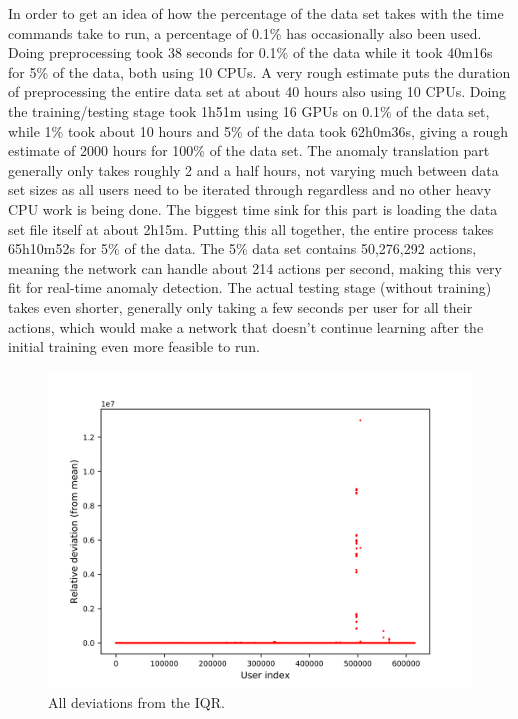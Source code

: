 In order to get an idea of how the percentage of the data set takes with the time commands take to run, a percentage of 0.1\% has occasionally also been used. Doing preprocessing took 38 seconds for 0.1\% of the data while it took 40m16s for 5\% of the data, both using 10 CPUs. A very rough estimate puts the duration of preprocessing the entire data set at about 40 hours also using 10 CPUs. Doing the training/testing stage took 1h51m using 16 GPUs on 0.1\% of the data set, while 1\% took about 10 hours and 5\% of the data took 62h0m36s, giving a rough estimate of 2000 hours for 100\% of the data set. The anomaly translation part generally only takes roughly 2 and a half hours, not varying much between data set sizes as all users need to be iterated through regardless and no other heavy CPU work is being done. The biggest time sink for this part is loading the data set file itself at about 2h15m. Putting this all together, the entire process takes 65h10m52s for 5\% of the data. The 5\% data set contains 50,276,292 actions, meaning the network can handle about 214 actions per second, making this very fit for real-time anomaly detection. The actual testing stage (without training) takes even shorter, generally only taking a few seconds per user for all their actions, which would make a network that doesn't continue learning after the initial training even more feasible to run.

\begin{figure}
	\begin{center}
		\includegraphics[scale=0.1]{evaluation/all_deviations}
	\end{center}
	\caption{All deviations from the IQR.~\label{fig:iqr_scale}}
\end{figure}

